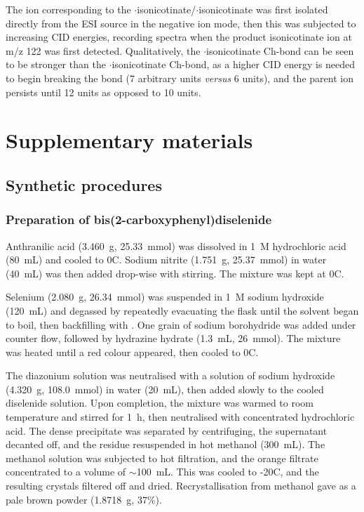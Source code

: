 \begin{refsection}
The ion corresponding to the $\cdot$isonicotinate/$\cdot$isonicotinate was first isolated directly from the ESI source in the negative ion mode, then this was subjected to increasing CID energies, recording spectra when the product isonicotinate ion at m/z 122 was first detected.
Qualitatively, the $\cdot$isonicotinate Ch-bond can be seen to be stronger than the $\cdot$isonicotinate Ch-bond, as a higher CID energy is needed to begin breaking the bond (7 arbitrary units \emph{versus} 6 units), and the parent ion persists until 12 units as opposed to 10 units.

\section{Supplementary materials}

\subsection{Synthetic procedures}

\subsubsection[Preparation of \refcmpd{diselenide}]{Preparation of bis(2-carboxyphenyl)diselenide }
\label{sec:diselenide_prep}
Anthranilic acid (3.460~g, 25.33~mmol) was dissolved in 1~\textsc{M} hydrochloric acid (80~mL) and cooled to 0\degree C.
Sodium nitrite (1.751~g, 25.37~mmol) in water (40~mL) was then added drop-wise with stirring.
The mixture was kept at 0\degree C.

Selenium (2.080~g, 26.34~mmol) was suspended in 1~\textsc{M} sodium hydroxide (120~mL) and degassed by repeatedly evacuating the flask until the solvent began to boil, then backfilling with .
One grain of sodium borohydride was added under  counter flow, followed by hydrazine hydrate (1.3~mL, 26~mmol).
The mixture was heated until a red colour appeared, then cooled to 0\degree C.

The diazonium solution was neutralised with a solution of sodium hydroxide (4.320~g, 108.0~mmol) in water (20~mL), then added slowly to the cooled diselenide solution.
Upon completion, the mixture was warmed to room temperature and stirred for 1~h, then neutralised with concentrated hydrochloric acid.
The dense precipitate was separated by centrifuging, the supernatant decanted off, and the residue resuspended in hot methanol (300~mL).
The methanol solution was subjected to hot filtration, and the orange filtrate concentrated to a volume of $\sim$100~mL.
This was cooled to -20\degree C, and the resulting crystals filtered off and dried.
Recrystallisation from methanol gave  as a pale brown powder (1.8718~g, 37\%).


\end{refsection}

